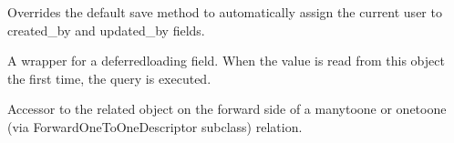 \documentclass[letterpaper,10pt,english]{sphinxmanual}
\begin{document}
\begin{fulllineitems}
\begin{fulllineitems}
\label{\detokenize{core:core.models.AuditableMixin.get_previous_by_updated_at}}
\pysigstartsignatures
\pysiglinewithargsret
{}
{\sphinxparamcomma {}\sphinxparamcomma {}\sphinxparamcomma {}}
{}
\pysigstopsignatures
\end{fulllineitems}


\begin{fulllineitems}
\label{\detokenize{core:id0}}
\pysigstartsignatures
\pysiglinewithargsret
{}
{\sphinxparamcomma {}}
{}
\pysigstopsignatures
\sphinxAtStartPar
Overrides the default save method to automatically assign
the current user to created\_by and updated\_by fields.

\end{fulllineitems}


\begin{fulllineitems}
\label{\detokenize{core:core.models.AuditableMixin.updated_at}}
\pysigstartsignatures
\pysigline
{}
\pysigstopsignatures
\sphinxAtStartPar
A wrapper for a deferred\sphinxhyphen{}loading field. When the value is read from this
object the first time, the query is executed.

\end{fulllineitems}


\begin{fulllineitems}
\label{\detokenize{core:core.models.AuditableMixin.updated_by}}
\pysigstartsignatures
\pysigline
{}
\pysigstopsignatures
\sphinxAtStartPar
Accessor to the related object on the forward side of a many\sphinxhyphen{}to\sphinxhyphen{}one or
one\sphinxhyphen{}to\sphinxhyphen{}one (via ForwardOneToOneDescriptor subclass) relation.


\end{fulllineitems}
\end{fulllineitems}
\end{document}

